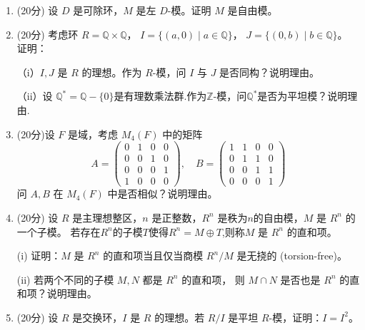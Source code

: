 \begin{enumerate}
\item (20分)
设 \( D \) 是可除环，\( M \) 是左 \( D \)-模。证明 \( M \) 是自由模。


\item (20分)
考虑环 \( R = \mathbb{Q} \times \mathbb{Q} \)，
\( I = \{ (a, 0) \mid a \in \mathbb{Q} \} \)，
\( J = \{ (0, b) \mid b \in \mathbb{Q} \} \)。 证明：

（i）\( I, J \) 是 \( R \) 的理想。作为 \( R \)-模，问 \( I \) 与 \( J \) 是否同构？说明理由。

（ii）设 \( \mathbb{Q}^*=\mathbb{Q} - \{0\} \)是有理数乘法群.作为$\mathbb{Z}$-模，问$\mathbb{Q}^*$是否为平坦模？说明理由.

\item (20分)设 \( F \) 是域，考虑 \( M_4(F) \) 中的矩阵
\[
A = \begin{pmatrix}
0 & 1 & 0 & 0 \\
0 & 0 & 1 & 0 \\
0 & 0 & 0 & 1 \\
1 & 0 & 0 & 0
\end{pmatrix}, \quad
B = \begin{pmatrix}
1 & 1 & 0 & 0 \\
0 & 1 & 1 & 0 \\
0 & 0 & 1 & 1 \\
0 & 0 & 0 & 1
\end{pmatrix}
\]
问 \( A, B \) 在 \( M_4(F) \) 中是否相似？说明理由。

\item (20分)
设 \( R \) 是主理想整区，\( n \) 是正整数，\( R^n \) 是秩为\(n\)的自由模，\( M \) 是 \( R^n \) 的一个子模。
若存在$R^n$的子模$T$使得$R^n=M \oplus T$,则称\( M \) 是 \( R^n \) 的直和项。


(i) 证明：\( M \) 是 \( R^n \) 的直和项当且仅当商模 \(R^n/M \) 是无挠的 (torsion-free)。


(ii) 若两个不同的子模 \( M, N \) 都是 \( R^n \) 的直和项，
则 \( M \cap N \) 是否也是 \( R^n \) 的直和项？说明理由。


\item (20分)
设 \( R \) 是交换环，\( I \) 是 \( R \) 的理想。若 \( R/I \) 是平坦 \( R \)-模，证明：\( I = I^2 \)。
\end{enumerate}
